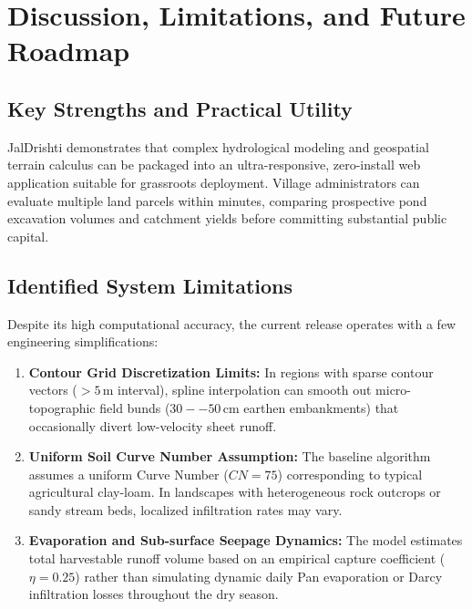 \documentclass[11pt,a4paper]{article}
\begin{document}
\section{Discussion, Limitations, and Future Roadmap}
\label{sec:discussion}

\subsection{Key Strengths and Practical Utility}
JalDrishti demonstrates that complex hydrological modeling and geospatial terrain calculus can be packaged into an ultra-responsive, zero-install web application suitable for grassroots deployment. Village administrators can evaluate multiple land parcels within minutes, comparing prospective pond excavation volumes and catchment yields before committing substantial public capital.

\subsection{Identified System Limitations}
Despite its high computational accuracy, the current release operates with a few engineering simplifications:
\begin{enumerate}[noitemsep,topsep=2pt]
    \item \textbf{Contour Grid Discretization Limits:} In regions with sparse contour vectors ($>5\,\text{m}$ interval), spline interpolation can smooth out micro-topographic field bunds ($30--50\,\text{cm}$ earthen embankments) that occasionally divert low-velocity sheet runoff.
    \item \textbf{Uniform Soil Curve Number Assumption:} The baseline algorithm assumes a uniform Curve Number ($CN = 75$) corresponding to typical agricultural clay-loam. In landscapes with heterogeneous rock outcrops or sandy stream beds, localized infiltration rates may vary.
    \item \textbf{Evaporation and Sub-surface Seepage Dynamics:} The model estimates total harvestable runoff volume based on an empirical capture coefficient ($\eta = 0.25$) rather than simulating dynamic daily Pan evaporation or Darcy infiltration losses throughout the dry season.
\end{enumerate}
\end{document}
